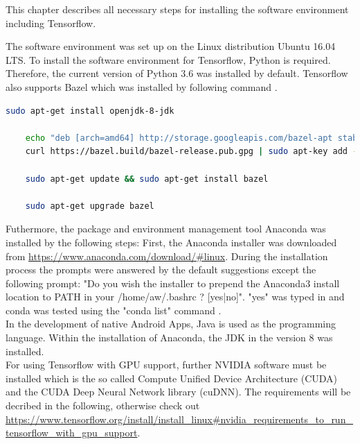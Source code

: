 This chapter describes all necessary steps for installing the software environment including Tensorflow.

The software environment was set up on the Linux distribution Ubuntu 16.04 LTS. To install the software environment for Tensorflow, Python is required. Therefore, the current version of Python 3.6 was installed by default. Tensorflow also supports Bazel which was installed by following command \citep{Bazel}.

\begin{minipage}{\linewidth}
\begin{lstlisting}[caption=Bazel Installation, label=list:bazel, language=bash]
	sudo apt-get install openjdk-8-jdk
	
	echo "deb [arch=amd64] http://storage.googleapis.com/bazel-apt stable jdk1.8" | sudo tee /etc/apt/				sources.list.d/bazel.list
	curl https://bazel.build/bazel-release.pub.gpg | sudo apt-key add -
	
	sudo apt-get update && sudo apt-get install bazel
	
	sudo apt-get upgrade bazel
\end{lstlisting}	
\end{minipage}

Futhermore, the package and environment management tool Anaconda was installed by the following steps:
First, the Anaconda installer was downloaded from \url{https://www.anaconda.com/download/#linux}. During the installation process the prompts were answered by the default suggestions except the following prompt: "Do you wish the installer to prepend the Anaconda3 install location to PATH in your /home/aw/.bashrc ? [yes|no]". "yes" was typed in and conda was tested using the "conda list" command \citep{Anaconda}. \\

In the development of native Android Apps, Java is used as the programming language. Within the installation of Anaconda, the JDK in the version 8 was installed. \\

For using Tensorflow with GPU support, further NVIDIA software must be installed which is the so called Compute Unified Device Architecture (CUDA) and the CUDA Deep Neural Network library (cuDNN). The requirements will be decribed in the following, otherwise check out \url{https://www.tensorflow.org/install/install_linux#nvidia_requirements_to_run_tensorflow_with_gpu_support}. \\

